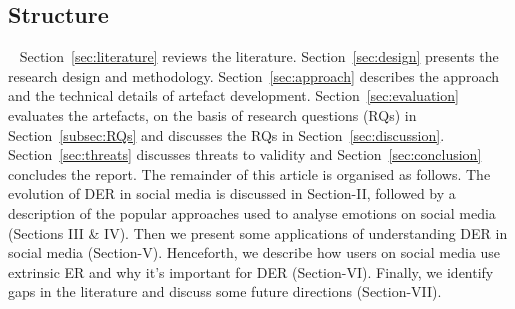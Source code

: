 \subsection{Structure}~\label{subsec:structure}
Section~\ref{sec:literature} reviews the literature. Section~\ref{sec:design} presents the research design and methodology. Section~\ref{sec:approach} describes the approach and the technical details of artefact development. Section~\ref{sec:evaluation} evaluates the artefacts, on the basis of research questions (RQs) in Section~\ref{subsec:RQs} and discusses the RQs in Section~\ref{sec:discussion}. Section~\ref{sec:threats} discusses threats to validity and Section~\ref{sec:conclusion} concludes the report. 
The remainder of this article is organised as follows. The evolution of DER in social media is discussed in Section-II, followed by a description of the popular approaches used to analyse emotions on social media (Sections III \& IV). Then we present some applications of understanding DER in social media  (Section-V). Henceforth, we describe how users on social media use extrinsic ER and why it's important for DER (Section-VI). Finally, we identify gaps in the literature and discuss some future directions (Section-VII).